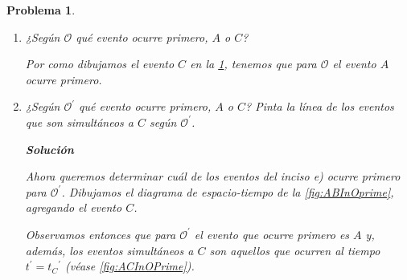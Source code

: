 \documentclass[12pt]{article}
\theoremstyle{break}
\newtheorem{exercise}{Problema}
\theoremstyle{nonumberbreak}
\newcommand*{\observer}{\mathcal{O}}
\newcommand*{\primeobserver}{\mathcal{O}^{\prime}}
\newcommand*{\inlinesol}{\vspace*{10pt}\textbf{Solución}\vspace*{10pt}}
\begin{document}
\begin{exercise}
\begin{enumerate}[label = \alph*)]
            \inlinesol

            Dibujamos un punto \(C\), tal que \(x = 0\), \textbf{i.e.}, \((c, 0)\), con \(c \neq 0\). Además, dibujamos el cono de luz correspondiente a cada evento, tenemos que la separación entre estos es de tipo \ul{temporaloide}.

            Analíticamente podemos comprobar esta afirmación, tal que,
            
            \begin{align*}
                (\Delta s)^{2} &= -(t_{C} - t_{A})^{2} + (x_{C} - x_{A})^{2},\\
                &= -(t_{C} - 0)^{2} + (0 - 0)^{2},\\
                &= -(t_{C})^{2}.
            \end{align*}

            \begin{figure}[htb]
                \centering
                \texttt{[image: example-image]}
                \caption{Conos de luz correspondientes a los eventos \(A\) y \(B\) para determinar el tipo de separación que hay entre estos.}
                \label{fig:ABIntervalInO}
            \end{figure}

            Notamos entonces que sin importar que el evento \(C\) suceda antes o después del evento \(A\), su intervalo siempre será \((\Delta s)^{2} < 0\), lo cual nos permite, una vez más, concluir que la separación entre los eventos es temporaloide. 

            \item ¿Según \(\observer\) qué evento ocurre primero, \(A\) o \(C\)?
            
            Por como dibujamos el evento \(C\) en la \cref{fig:ABIntervalInO}, tenemos que para \(\observer\) el evento \(A\) ocurre primero.

            \item ¿Según \(\primeobserver\) qué evento ocurre primero, \(A\) o \(C\)? Pinta la línea de los eventos que son simultáneos a \(C\) según \(\primeobserver\).
            
            \inlinesol

            Ahora queremos determinar cuál de los eventos del inciso e) ocurre primero para \(\primeobserver\). Dibujamos el diagrama de espacio-tiempo de la \cref*{fig:ABInOprime}, agregando el evento \(C\).

            Observamos entonces que para \(\primeobserver\) el evento que ocurre primero es \(A\) y, además, los eventos simultáneos a \(C\) son aquellos que ocurren al tiempo \(t^{\prime} = {t_{C}}^{\prime}\) (véase \cref{fig:ACInOPrime}).


\end{enumerate}
\end{exercise}
\end{document}
